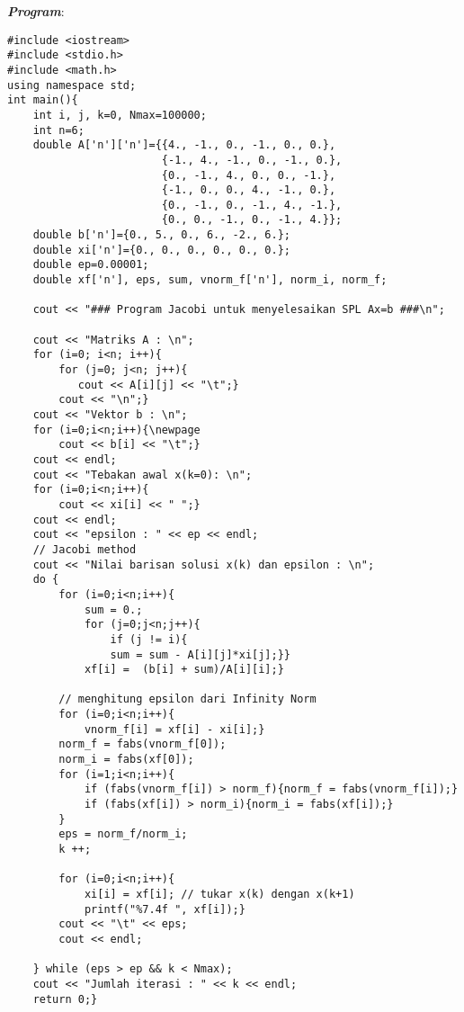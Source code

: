 \documentclass[paper=a4, fontsize=11pt]{scrartcl}
\numberwithin{equation}{section} %
\numberwithin{figure}{section} %
\numberwithin{table}{section} %
\begin{document}
\textit{\textbf{Program}}:
\begin{small}
\begin{verbatim}
#include <iostream>
#include <stdio.h>
#include <math.h>
using namespace std;
int main(){    
    int i, j, k=0, Nmax=100000;
    int n=6;
    double A['n']['n']={{4., -1., 0., -1., 0., 0.},
                        {-1., 4., -1., 0., -1., 0.},
                        {0., -1., 4., 0., 0., -1.},
                        {-1., 0., 0., 4., -1., 0.},
                        {0., -1., 0., -1., 4., -1.},
                        {0., 0., -1., 0., -1., 4.}};
    double b['n']={0., 5., 0., 6., -2., 6.};
    double xi['n']={0., 0., 0., 0., 0., 0.};
    double ep=0.00001;
    double xf['n'], eps, sum, vnorm_f['n'], norm_i, norm_f;

    cout << "### Program Jacobi untuk menyelesaikan SPL Ax=b ###\n";
    
    cout << "Matriks A : \n";
    for (i=0; i<n; i++){
        for (j=0; j<n; j++){ 
           cout << A[i][j] << "\t";}
        cout << "\n";}
    cout << "Vektor b : \n";
    for (i=0;i<n;i++){\newpage
        cout << b[i] << "\t";}
    cout << endl;
    cout << "Tebakan awal x(k=0): \n";
    for (i=0;i<n;i++){
        cout << xi[i] << " ";}
    cout << endl; 
    cout << "epsilon : " << ep << endl;
    // Jacobi method 
    cout << "Nilai barisan solusi x(k) dan epsilon : \n";
    do {
        for (i=0;i<n;i++){
            sum = 0.;
            for (j=0;j<n;j++){
                if (j != i){
                sum = sum - A[i][j]*xi[j];}}
            xf[i] =  (b[i] + sum)/A[i][i];}
        
        // menghitung epsilon dari Infinity Norm
        for (i=0;i<n;i++){
            vnorm_f[i] = xf[i] - xi[i];}
        norm_f = fabs(vnorm_f[0]);
        norm_i = fabs(xf[0]);
        for (i=1;i<n;i++){
            if (fabs(vnorm_f[i]) > norm_f){norm_f = fabs(vnorm_f[i]);}
            if (fabs(xf[i]) > norm_i){norm_i = fabs(xf[i]);}
        }
        eps = norm_f/norm_i;
        k ++;

        for (i=0;i<n;i++){
            xi[i] = xf[i]; // tukar x(k) dengan x(k+1)
            printf("%7.4f ", xf[i]);}
        cout << "\t" << eps;
        cout << endl;

    } while (eps > ep && k < Nmax);
    cout << "Jumlah iterasi : " << k << endl;
    return 0;}
\end{verbatim}
\end{small}
\end{document}

